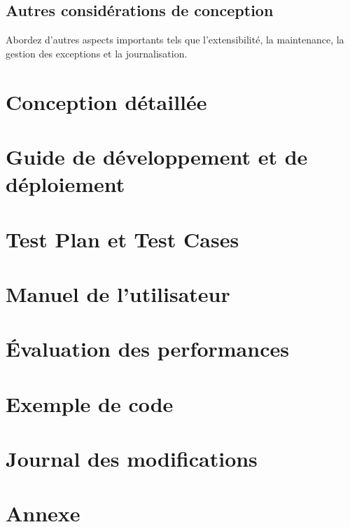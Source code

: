 \documentclass{article}
\begin{document}
\subsection{Autres considérations de conception}

Abordez d'autres aspects importants tels que l'extensibilité, la maintenance, la gestion des exceptions et la journalisation.


\section{Conception détaillée}
\section{Guide de développement et de déploiement}
\section{Test Plan et Test Cases}
\section{Manuel de l'utilisateur}
\section{Évaluation des performances}
\section{Exemple de code}
\section{Journal des modifications}
\section{Annexe}
\end{document}
